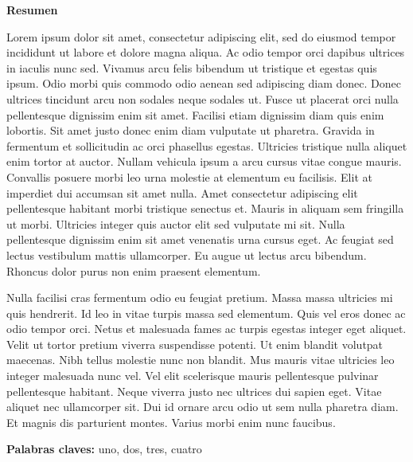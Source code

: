 \thispagestyle{plain}
\begin{center}
	\vspace*{1.5cm}
	{\Large \bfseries  Resumen}
\end{center}
\vspace{0.5cm}
Lorem ipsum dolor sit amet, consectetur adipiscing elit, sed do eiusmod tempor incididunt ut labore et dolore magna aliqua. Ac odio tempor orci dapibus ultrices in iaculis nunc sed. Vivamus arcu felis bibendum ut tristique et egestas quis ipsum. Odio morbi quis commodo odio aenean sed adipiscing diam donec. Donec ultrices tincidunt arcu non sodales neque sodales ut. Fusce ut placerat orci nulla pellentesque dignissim enim sit amet. Facilisi etiam dignissim diam quis enim lobortis. Sit amet justo donec enim diam vulputate ut pharetra. Gravida in fermentum et sollicitudin ac orci phasellus egestas. Ultricies tristique nulla aliquet enim tortor at auctor. Nullam vehicula ipsum a arcu cursus vitae congue mauris. Convallis posuere morbi leo urna molestie at elementum eu facilisis. Elit at imperdiet dui accumsan sit amet nulla. Amet consectetur adipiscing elit pellentesque habitant morbi tristique senectus et. Mauris in aliquam sem fringilla ut morbi. Ultricies integer quis auctor elit sed vulputate mi sit. Nulla pellentesque dignissim enim sit amet venenatis urna cursus eget. Ac feugiat sed lectus vestibulum mattis ullamcorper. Eu augue ut lectus arcu bibendum. Rhoncus dolor purus non enim praesent elementum. 

Nulla facilisi cras fermentum odio eu feugiat pretium. Massa massa ultricies mi quis hendrerit. Id leo in vitae turpis massa sed elementum. Quis vel eros donec ac odio tempor orci. Netus et malesuada fames ac turpis egestas integer eget aliquet. Velit ut tortor pretium viverra suspendisse potenti. Ut enim blandit volutpat maecenas. Nibh tellus molestie nunc non blandit. Mus mauris vitae ultricies leo integer malesuada nunc vel. Vel elit scelerisque mauris pellentesque pulvinar pellentesque habitant. Neque viverra justo nec ultrices dui sapien eget. Vitae aliquet nec ullamcorper sit. Dui id ornare arcu odio ut sem nulla pharetra diam. Et magnis dis parturient montes. Varius morbi enim nunc faucibus.
\newline

\textbf{Palabras claves: } uno, dos, tres, cuatro